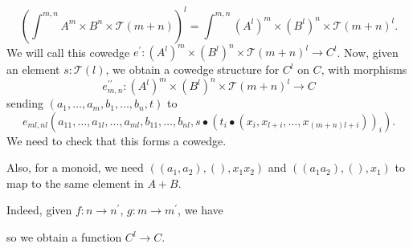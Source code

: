 \documentclass{amsbook}
\newcommand{\id}[1]{\ensuremath{\text{id}_{#1}}}
\theoremstyle{definition}
\begin{document}
  \[ \left( \int^{m, n} A^m \times B^n \times \mathcal T(m + n) \right)^l = \int^{m, n} \left( A^l \right)^m \times \left( B^l \right)^n \times \mathcal T(m + n)^l. \]
  We will call this cowedge $ e^\prime: \left( A^l \right)^m \times \left( B^l \right)^n \times \mathcal T(m + n)^l \to C^l $. Now, given an element $ s: \mathcal T(l) $, we obtain a cowedge structure for $ C^l $ on $ C $, with morphisms
  \[ e^{\prime\prime}_{m, n}: \left( A^l \right)^m \times \left( B^l \right)^n \times \mathcal T(m + n)^l \to C \]
  sending $ (a_1, \dots, a_m, b_1, \dots, b_n, t) $ to
  \[ e_{ml, nl} (a_{11}, \dots, a_{1l}, \dots, a_{ml}, b_{11}, \dots, b_{nl}, s \bullet (t_i \bullet (x_i, x_{l + i}, \dots, x_{(m + n)l + i}))_i). \]
  We need to check that this forms a cowedge.

  Also, for a monoid, we need $ ((a_1, a_2), (), x_1 x_2) $ and $ ((a_1 a_2), (), x_1) $ to map to the same element in $ A + B $.



  Indeed, given $ f: n \to n^\prime $, $ g: m \to m^\prime $, we have
  \begin{center}
  \end{center}
  so we obtain a function $ C^l \to C $.

  
  
\end{document}
